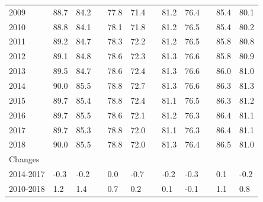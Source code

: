 \documentclass[
  11pt,
]{article}
\begin{document}
\begin{table}[h]
\begin{tabular}{@{}llllllllllll@{}}
2009      & 88.7              & 84.2             &  & 77.8               & 71.4              &  & 81.2               & 76.4              &  & 85.4          & 80.1         \\
2010      & 88.8              & 84.1             &  & 78.1               & 71.8              &  & 81.2               & 76.5              &  & 85.4          & 80.2         \\
2011      & 89.2              & 84.7             &  & 78.3               & 72.2              &  & 81.2               & 76.5              &  & 85.8          & 80.8         \\
2012      & 89.1              & 84.8             &  & 78.6               & 72.3              &  & 81.3               & 76.6              &  & 85.8          & 80.9         \\
2013      & 89.5              & 84.7             &  & 78.6               & 72.4              &  & 81.3               & 76.6              &  & 86.0          & 81.0         \\
2014      & 90.0              & 85.5             &  & 78.8               & 72.7              &  & 81.3               & 76.6              &  & 86.3          & 81.3         \\
2015      & 89.7              & 85.4             &  & 78.8               & 72.4              &  & 81.1               & 76.5              &  & 86.3          & 81.2         \\
2016      & 89.7              & 85.5             &  & 78.6               & 72.1              &  & 81.2               & 76.3              &  & 86.4          & 81.1         \\
2017      & 89.7              & 85.3             &  & 78.8               & 72.0              &  & 81.1               & 76.3              &  & 86.4          & 81.1         \\
2018      & 90.0              & 85.5             &  & 78.8               & 72.0              &  & 81.3               & 76.4              &  & 86.5          & 81.0         \\
Changes   &                   &                  &  &                    &                   &  &                    &                   &  &               &              \\
2014-2017 & -0.3              & -0.2             &  & 0.0                & -0.7              &  & -0.2               & -0.3              &  & 0.1           & -0.2         \\
2010-2018 & 1.2               & 1.4              &  & 0.7                & 0.2               &  & 0.1                & -0.1              &  & 1.1           & 0.8          \\ \bottomrule
\end{tabular}
\end{table}
\end{document}
